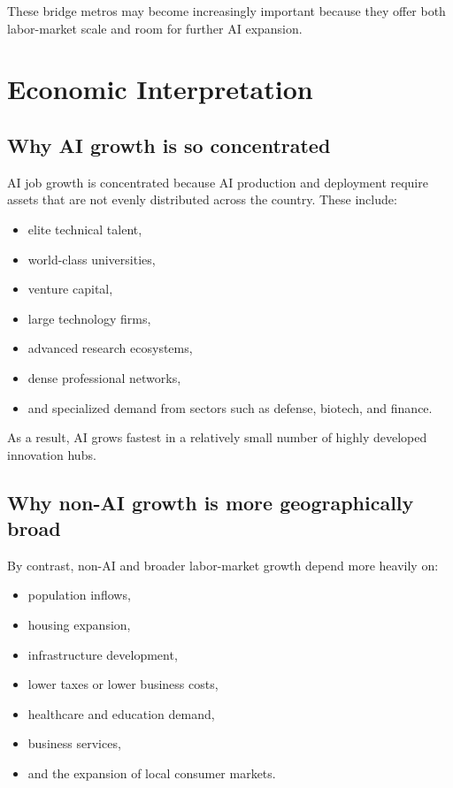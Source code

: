 \documentclass[12pt,a4paper]{article}
\begin{document}
These bridge metros may become increasingly important because they offer both labor-market scale and room for further AI expansion.

\section{Economic Interpretation}

\subsection{Why AI growth is so concentrated}

AI job growth is concentrated because AI production and deployment require assets that are not evenly distributed across the country. These include:

\begin{itemize}
    \item elite technical talent,
    \item world-class universities,
    \item venture capital,
    \item large technology firms,
    \item advanced research ecosystems,
    \item dense professional networks,
    \item and specialized demand from sectors such as defense, biotech, and finance.
\end{itemize}

As a result, AI grows fastest in a relatively small number of highly developed innovation hubs.

\subsection{Why non-AI growth is more geographically broad}

By contrast, non-AI and broader labor-market growth depend more heavily on:

\begin{itemize}
    \item population inflows,
    \item housing expansion,
    \item infrastructure development,
    \item lower taxes or lower business costs,
    \item healthcare and education demand,
    \item business services,
    \item and the expansion of local consumer markets.
\end{itemize}
\end{document}
